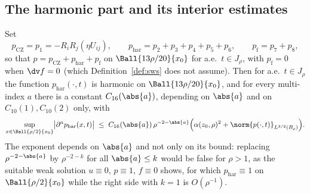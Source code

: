 \documentclass[11pt,reqno]{amsart}
\begin{document}
\subsection{The harmonic part and its interior estimates}\label{ss:harmonic}

\begin{corollary}
\label{cor:CZ-harmonic}
Set
\begin{equation}\label{eq:CZ-harmonic}
  p_{\mathrm{CZ}}=p_{1}=-R_{i}R_{j}(\eta U_{ij}),
  \qquad
  p_{\mathrm{har}}=p_{2}+p_{3}+p_{4}+p_{5}+p_{6},
  \qquad
  p_{\mathrm{f}}=p_{7}+p_{8},
\end{equation}
so that $p=p_{\mathrm{CZ}}+p_{\mathrm{har}}+p_{\mathrm{f}}$ on
$\Ball{13\rho/20}{x_{0}}$ for a.e.\ $t\in J_{\rho}$, with
$p_{\mathrm{f}}=0$ when $\dv f=0$ (which Definition~\ref{def:sws} does not
assume). Then for a.e.\ $t\in J_{\rho}$ the function
$p_{\mathrm{har}}(\cdot,t)$ is harmonic on $\Ball{13\rho/20}{x_{0}}$, and for
every multi-index $a$ there is a constant $C_{16}(\abs{a})$, depending on
$\abs{a}$ and on $C_{10}(1),C_{10}(2)$ only, with
\begin{equation}\label{eq:har-Ck}
  \sup_{x\in\Ball{\rho/2}{x_{0}}}
    \bigl|\partial^{a}p_{\mathrm{har}}(x,t)\bigr|
  \;\le\;C_{16}(\abs{a})\,\rho^{-2-\abs{a}}
      \Bigl(\alpha(z_{0},\rho)^{2}+\norm{p(\cdot,t)}_{L^{3/2}(B_{\rho})}\Bigr).
\end{equation}
The exponent depends on $\abs{a}$ and not only on its bound: replacing
$\rho^{-2-\abs{a}}$ by $\rho^{-2-k}$ for all $\abs{a}\le k$ would be false for
$\rho>1$, as the suitable weak solution $u\equiv0$, $p\equiv1$, $f\equiv0$
shows, for which $p_{\mathrm{har}}\equiv1$ on $\Ball{\rho/2}{x_{0}}$ while the
right side with $k=1$ is $O(\rho^{-1})$.
\end{corollary}
\end{document}
